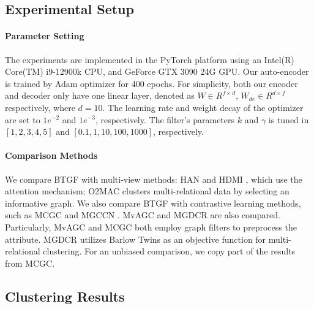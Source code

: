 \documentclass[letterpaper]{article} %
\begin{document}
\subsection{Experimental Setup}
{
\setlength{\parindent}{0cm}
\paragraph{\bf{Parameter Setting}}The experiments are implemented in the PyTorch platform
using an Intel(R) Core(TM) i9-12900k CPU, and GeForce GTX 3090 24G GPU.
Our auto-encoder is trained by Adam optimizer \cite{kingma2017adam} for 400 epochs.
For simplicity, both our encoder and decoder only have one linear layer, denoted as $W \in R^{f \times d}$, $W_{de} \in R^{d\times f}$ respectively, where $d=10$.
The learning rate and weight decay of the optimizer are set to $1e^{-2}$ and $1e^{-3}$, respectively. The filter's parameters $k$ and $\gamma$ is tuned in $[1,2,3,4,5]$ and $[0.1,1,10,100,1000]$, respectively.
}
{
\setlength{\parindent}{0cm}
\paragraph{\bf{Comparison Methods}}We compare BTGF with multi-view methods: HAN \cite{10.1145/3308558.3313562} and HDMI \cite{jing2021hdmi}, which use the attention mechanism; O2MAC \cite{fan2020one2multi} clusters multi-relational data by selecting an informative graph. We also compare BTGF with contrastive learning methods, such as MCGC \cite{pan2021multi} and MGCCN \cite{10.1016/j.ins.2022.09.042}. MvAGC \cite{lin2021graph} and MGDCR \cite{mo2023multiplex} are also compared. Particularly, MvAGC and MCGC both employ graph filters to preprocess the attribute. MGDCR utilizes Barlow Twins as an objective function for multi-relational clustering. For an unbiased comparison, we copy part of the results from MCGC.
}


\subsection{Clustering Results}
\end{document}
